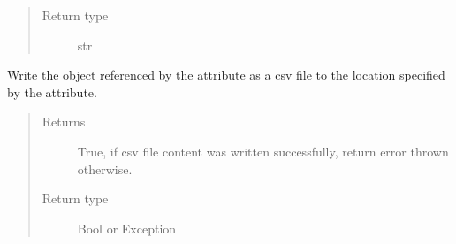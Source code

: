 \documentclass[letterpaper,10pt,english]{sphinxmanual}
\begin{document}
\begin{fulllineitems}
\begin{fulllineitems}
\begin{quote}
\begin{description}
\item[{Return type}] \leavevmode
str

\end{description}\end{quote}

\end{fulllineitems}


\begin{fulllineitems}
\label{\detokenize{polo.utils:polo.utils.io_utils.RunCsvWriter.write_csv}}
Write the  object referenced by the 
attribute as a csv file to the location specified
by the  {\hyperref[\detokenize{polo.utils:polo.utils.io_utils.RunCsvWriter.output_path}]{}}
attribute.
\begin{quote}\begin{description}
\item[{Returns}] \leavevmode
True, if csv file content was written successfully,
return error thrown otherwise.

\item[{Return type}] \leavevmode
Bool or Exception

\end{description}\end{quote}

\end{fulllineitems}


\end{fulllineitems}

\end{document}
